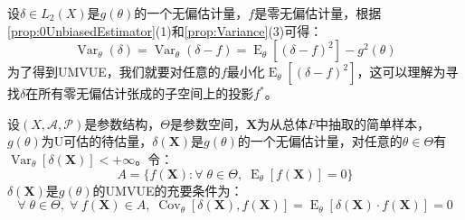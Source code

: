 \begin{note}
	设$\delta\in L_2(X)$是$g(\theta)$的一个无偏估计量，$f$是零无偏估计量，根据\cref{prop:0UnbiasedEstimator}(1)和\cref{prop:Variance}(3)可得：
	\begin{equation*}
		\operatorname{Var}_{\theta}(\delta)=\operatorname{Var}_{\theta}(\delta-f)=\operatorname{E}_{\theta}[(\delta-f)^2]-g^2(\theta)
	\end{equation*}
	为了得到UMVUE，我们就要对任意的$f$最小化$\operatorname{E}_{\theta}[(\delta-f)^2]$，这可以理解为寻找$\delta$在所有零无偏估计张成的子空间上的投影$f^*$。
\end{note}
\begin{theorem}\label{theo:UMVUE0UnbiasedEstimation}
	设$(X,\mathscr{A},\mathscr{P})$是参数结构，$\Theta$是参数空间，$\mathbf{X}$为从总体$F$中抽取的简单样本，$g(\theta)$为U可估的待估量，$\delta(\mathbf{X})$是$g(\theta)$的一个无偏估计量，对任意的$\theta\in\Theta$有$\operatorname{Var}_{\theta}[\delta(\mathbf{X})]<+\infty$。令：
	\begin{equation*}
		A=\{f(\mathbf{X}):\forall\;\theta\in\Theta,\;\operatorname{E}_{\theta}[f(\mathbf{X})]=0\}
	\end{equation*}
	$\delta(\mathbf{X})$是$g(\theta)$的UMVUE的充要条件为：
	\begin{equation*}
		\forall\;\theta\in\Theta,\;\forall\;f(\mathbf{X})\in A,\;\operatorname{Cov}_{\theta}[\delta(\mathbf{X}),f(\mathbf{X})]=\operatorname{E}_{\theta}[\delta(\mathbf{X})\cdot f(\mathbf{X})]=0
	\end{equation*}
\end{theorem}
